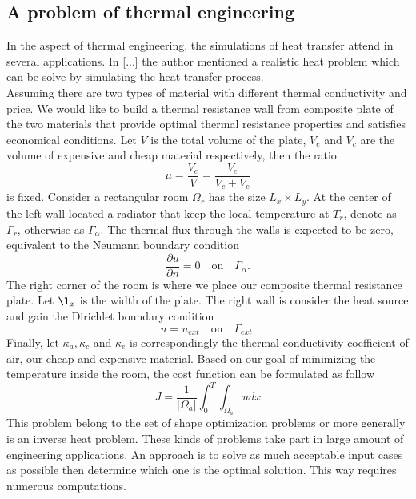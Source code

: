 \documentclass[notitlepage,a4paper,fleqn,9pt]{icmfarticle}
\begin{document}
\begin{multicols}{2}
\subsection{A problem of thermal engineering}
In the aspect of thermal engineering, the simulations of heat transfer attend in several applications. In [...] the author mentioned a realistic heat problem which can be solve by simulating the heat transfer process.\\
Assuming there are two types of material with different thermal conductivity and price. We would like to build a thermal resistance wall from composite plate of the two materials that provide optimal thermal resistance properties and satisfies economical conditions. Let $V$ is the total volume of the plate, $V_e$ and $V_c$ are the volume of expensive and cheap material respectively, then the ratio
$$
\mu = \dfrac{V_e}{V} = \dfrac{V_e}{V_c + V_e}
$$
is fixed. Consider a rectangular room $\Omega_r$ has the size $L_x \times L_y$. At the center of the left wall located a radiator that keep the local temperature at $T_r$, denote as $\Gamma_r$, otherwise as $\Gamma_\alpha$. The thermal flux through the walls is expected to be zero, equivalent to the Neumann boundary condition
$$
\dfrac{\partial u}{\partial n} = 0 \quad \text{on} \quad \Gamma_\alpha.
$$
The right corner of the room is where we place our composite thermal resistance plate. Let $\l_x$ is the width of the plate. The right wall is consider the heat source and gain the Dirichlet boundary condition
$$
u = u_{ext} \quad \text{on} \quad \Gamma_{ext}.
$$
Finally, let $\kappa_a, \kappa_c$ and $\kappa_e$ is correspondingly the thermal conductivity coefficient of air, our cheap and expensive material. Based on our goal of minimizing the temperature inside the room, the cost function can be formulated as follow
$$
J = \dfrac{1}{|\Omega_a|}\int_{0}^{T} \int_{\Omega_a} u dx 
$$
This problem belong to the set of shape optimization problems or more generally is an inverse heat problem. These kinds of problems take part in large amount of engineering applications. An approach is to solve as much acceptable input cases as possible then determine which one is the optimal solution. This way requires numerous computations.

\end{multicols}
\end{document}
